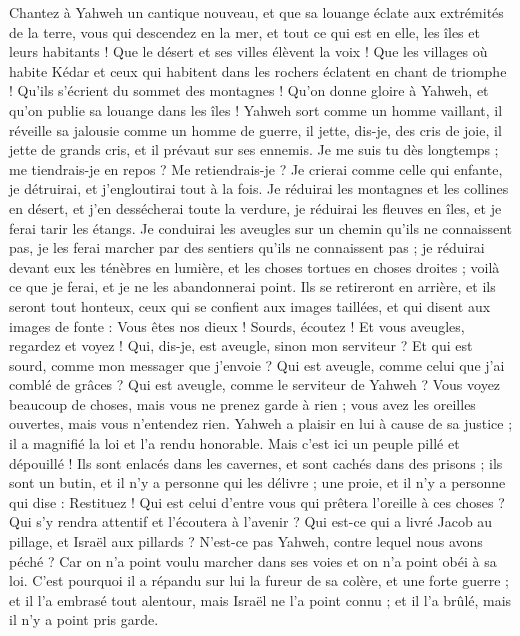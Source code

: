 \begin{multicols}{2}
Chantez à Yahweh un cantique nouveau, et que sa louange éclate aux extrémités de la terre, vous qui descendez en la mer, et tout ce qui est en elle, les îles et leurs habitants !
Que le désert et ses villes élèvent la voix ! Que les villages où habite Kédar et ceux qui habitent dans les rochers éclatent en chant de triomphe ! Qu'ils s'écrient du sommet des montagnes !
Qu'on donne gloire à Yahweh, et qu'on publie sa louange dans les îles !
Yahweh sort comme un homme vaillant, il réveille sa jalousie comme un homme de guerre, il jette, dis-je, des cris de joie, il jette de grands cris, et il prévaut sur ses ennemis.
Je me suis tu dès longtemps ; me tiendrais-je en repos ? Me retiendrais-je ? Je crierai comme celle qui enfante, je détruirai, et j'engloutirai tout à la fois.
Je réduirai les montagnes et les collines en désert, et j'en dessécherai toute la verdure, je réduirai les fleuves en îles, et je ferai tarir les étangs.
Je conduirai les aveugles sur un chemin qu'ils ne connaissent pas, je les ferai marcher par des sentiers qu'ils ne connaissent pas ; je réduirai devant eux les ténèbres en lumière, et les choses tortues en choses droites ; voilà ce que je ferai, et je ne les abandonnerai point.
Ils se retireront en arrière, et ils seront tout honteux, ceux qui se confient aux images taillées, et qui disent aux images de fonte : Vous êtes nos dieux !
Sourds, écoutez ! Et vous aveugles, regardez et voyez !
Qui, dis-je, est aveugle, sinon mon serviteur ? Et qui est sourd, comme mon messager que j'envoie ? Qui est aveugle, comme celui que j'ai comblé de grâces ? Qui est aveugle, comme le serviteur de Yahweh ?
Vous voyez beaucoup de choses, mais vous ne prenez garde à rien ; vous avez les oreilles ouvertes, mais vous n'entendez rien.
Yahweh a plaisir en lui à cause de sa justice ; il a magnifié la loi et l'a rendu honorable. 
Mais c'est ici un peuple pillé et dépouillé ! Ils sont enlacés dans les cavernes, et sont cachés dans des prisons ; ils sont un butin, et il n'y a personne qui les délivre ; une proie, et il n'y a personne qui dise : Restituez !
Qui est celui d'entre vous qui prêtera l'oreille à ces choses ? Qui s'y rendra attentif et l'écoutera à l'avenir ?
Qui est-ce qui a livré Jacob au pillage, et Israël aux pillards ? N'est-ce pas Yahweh, contre lequel nous avons péché ? Car on n'a point voulu marcher dans ses voies et on n'a point obéi à sa loi.
C'est pourquoi il a répandu sur lui la fureur de sa colère, et une forte guerre ; et il l'a embrasé tout alentour, mais Israël ne l'a point connu ; et il l'a brûlé, mais il n'y a point pris garde.

\end{multicols}

